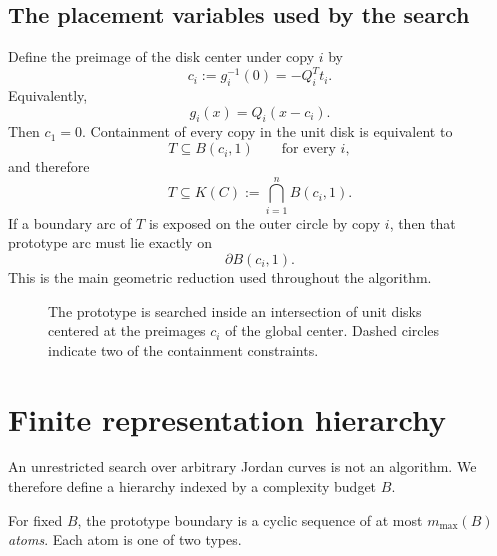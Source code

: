 \documentclass[11pt]{article}
\begin{document}
\subsection{The placement variables used by the search}

Define the preimage of the disk center under copy $i$ by
\[
c_i:=g_i^{-1}(0)=-Q_i^Tt_i.
\]
Equivalently,
\[
g_i(x)=Q_i(x-c_i).
\]
Then $c_1=0$. Containment of every copy in the unit disk is equivalent to
\[
T\subseteq B(c_i,1)\qquad\text{for every }i,
\]
and therefore
\begin{equation}
\boxed{T\subseteq K(C):=\bigcap_{i=1}^n B(c_i,1).}
\label{eq:lens}
\end{equation}
If a boundary arc of $T$ is exposed on the outer circle by copy $i$, then that prototype arc must lie exactly on
\[
\partial B(c_i,1).
\]
This is the main geometric reduction used throughout the algorithm.

\begin{figure}[ht]
\centering
{}
\caption{The prototype is searched inside an intersection of unit disks centered at the preimages $c_i$ of the global center. Dashed circles indicate two of the containment constraints.}
\label{fig:lens}
\end{figure}

\section{Finite representation hierarchy}

An unrestricted search over arbitrary Jordan curves is not an algorithm. We therefore define a hierarchy indexed by a complexity budget $B$.

For fixed $B$, the prototype boundary is a cyclic sequence of at most $m_{\max}(B)$ \emph{atoms}. Each atom is one of two types.
\end{document}
